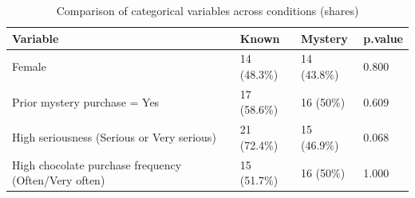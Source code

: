 \begin{table}

\caption{\label{tab:tab:cat_compare}Comparison of categorical variables across conditions (shares)}
\centering
\begin{tabular}[t]{llll}
\toprule
Variable & Known & Mystery & p.value\\
\midrule
Female & 14 (48.3\%) & 14 (43.8\%) & 0.800\\
Prior mystery purchase = Yes & 17 (58.6\%) & 16 (50\%) & 0.609\\
High seriousness (Serious or Very serious) & 21 (72.4\%) & 15 (46.9\%) & 0.068\\
High chocolate purchase frequency (Often/Very often) & 15 (51.7\%) & 16 (50\%) & 1.000\\
\bottomrule
\end{tabular}
\end{table}
